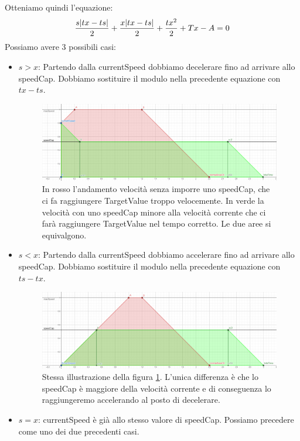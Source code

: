 \documentclass[main.tex]{subfiles}
\begin{document}
Otteniamo quindi l'equazione:
\[\frac{s\abs{tx - ts}}{2} + \frac{x\abs{tx - ts}}{2} + \frac{tx^2}{2} + Tx - A = 0\]
Possiamo avere 3 possibili casi:\newline
\begin{itemize}
    \item $s > x$: Partendo dalla currentSpeed dobbiamo decelerare fino ad arrivare allo speedCap. Dobbiamo sostituire il modulo nella precedente equazione con $tx - ts$.
    \begin{figure}[H]
        \centering
        \includegraphics[width=.9\linewidth]{img/interpolazione/speedCapCalcGE.png}
        \caption{In rosso l'andamento velocità senza imporre uno speedCap, che ci fa raggiungere TargetValue troppo velocemente. In verde la velocità con uno speedCap  minore alla velocità corrente che ci farà raggiungere TargetValue nel tempo corretto. Le due aree si equivalgono.}
        \label{fig:4_speedCapCalcGE}
    \end{figure}
\clearpage %
    \item $s < x$: Partendo dalla currentSpeed dobbiamo accelerare fino ad arrivare allo speedCap. Dobbiamo sostituire il modulo nella precedente equazione con $ts - tx$.
    \begin{figure}[H]
        \centering
        \includegraphics[width=.9\linewidth]{img/interpolazione/speedCapCalcBE.png}
        \caption{Stessa illustrazione della figura \ref{fig:4_speedCapCalcGE}. L'unica differenza è che lo speedCap è maggiore della velocità corrente e di conseguenza lo raggiungeremo accelerando al posto di decelerare.}
        \label{fig:4_speedCapCalcBE}
    \end{figure}

\item $s = x$: currentSpeed è già allo stesso valore di speedCap. Possiamo precedere come uno dei due precedenti casi. \newline
\end{itemize}
\end{document}
